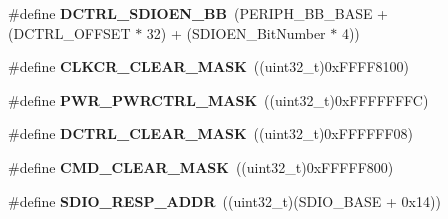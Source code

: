 \begin{DoxyCompactItemize}
\item 
\hypertarget{group___s_d_i_o_ga894f7da62b89ddd9f4b79d066056a3c7}{\#define {\bfseries D\-C\-T\-R\-L\-\_\-\-S\-D\-I\-O\-E\-N\-\_\-\-B\-B}~(P\-E\-R\-I\-P\-H\-\_\-\-B\-B\-\_\-\-B\-A\-S\-E + (D\-C\-T\-R\-L\-\_\-\-O\-F\-F\-S\-E\-T $\ast$ 32) + (S\-D\-I\-O\-E\-N\-\_\-\-Bit\-Number $\ast$ 4))}\label{group___s_d_i_o_ga894f7da62b89ddd9f4b79d066056a3c7}

\item 
\hypertarget{group___s_d_i_o_gac8d10dd1e49ca9e8a6954146654e9a01}{\#define {\bfseries C\-L\-K\-C\-R\-\_\-\-C\-L\-E\-A\-R\-\_\-\-M\-A\-S\-K}~((uint32\-\_\-t)0x\-F\-F\-F\-F8100)}\label{group___s_d_i_o_gac8d10dd1e49ca9e8a6954146654e9a01}

\item 
\hypertarget{group___s_d_i_o_ga7e6ec7be68d0fbb8fb4e3725cca9a05c}{\#define {\bfseries P\-W\-R\-\_\-\-P\-W\-R\-C\-T\-R\-L\-\_\-\-M\-A\-S\-K}~((uint32\-\_\-t)0x\-F\-F\-F\-F\-F\-F\-F\-C)}\label{group___s_d_i_o_ga7e6ec7be68d0fbb8fb4e3725cca9a05c}

\item 
\hypertarget{group___s_d_i_o_ga9e9fc7810b95805aeeb760bbdd87fa9b}{\#define {\bfseries D\-C\-T\-R\-L\-\_\-\-C\-L\-E\-A\-R\-\_\-\-M\-A\-S\-K}~((uint32\-\_\-t)0x\-F\-F\-F\-F\-F\-F08)}\label{group___s_d_i_o_ga9e9fc7810b95805aeeb760bbdd87fa9b}

\item 
\hypertarget{group___s_d_i_o_ga2325d77090e44221b07f8fba5bc9217e}{\#define {\bfseries C\-M\-D\-\_\-\-C\-L\-E\-A\-R\-\_\-\-M\-A\-S\-K}~((uint32\-\_\-t)0x\-F\-F\-F\-F\-F800)}\label{group___s_d_i_o_ga2325d77090e44221b07f8fba5bc9217e}

\item 
\hypertarget{group___s_d_i_o_ga4285ce49b005e3d03ddf9fdc491c4d70}{\#define {\bfseries S\-D\-I\-O\-\_\-\-R\-E\-S\-P\-\_\-\-A\-D\-D\-R}~((uint32\-\_\-t)(S\-D\-I\-O\-\_\-\-B\-A\-S\-E + 0x14))}\label{group___s_d_i_o_ga4285ce49b005e3d03ddf9fdc491c4d70}

\end{DoxyCompactItemize}
